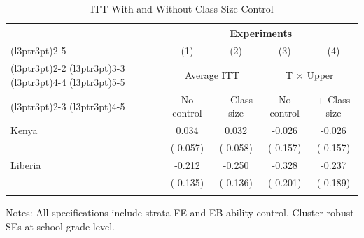 \begin{table}[!h]
\centering
\caption{ITT With and Without Class-Size Control}
\label{tab:classsize_diag}
\begin{threeparttable}
\begin{tabular}[t]{lcccc}
\toprule
\multicolumn{1}{c}{ } & \multicolumn{4}{c}{Experiments} \\
\cmidrule(l{3pt}r{3pt}){2-5}
\multicolumn{1}{c}{ } & \multicolumn{1}{c}{(1)} & \multicolumn{1}{c}{(2)} & \multicolumn{1}{c}{(3)} & \multicolumn{1}{c}{(4)} \\
\cmidrule(l{3pt}r{3pt}){2-2} \cmidrule(l{3pt}r{3pt}){3-3} \cmidrule(l{3pt}r{3pt}){4-4} \cmidrule(l{3pt}r{3pt}){5-5}
 & \multicolumn{2}{c}{Average ITT} & \multicolumn{2}{c}{T $\times$ Upper} \\
\cmidrule(l{3pt}r{3pt}){2-3} \cmidrule(l{3pt}r{3pt}){4-5}
 & No control & + Class size & No control & + Class size \\
\midrule
Kenya &   0.034 &   0.032 &  -0.026 &  -0.026 \\
 & (  0.057) & (  0.058) & (  0.157) & (  0.157) \\
\addlinespace
Liberia &  -0.212 &  -0.250 &  -0.328 &  -0.237 \\
 & (  0.135) & (  0.136) & (  0.201) & (  0.189) \\
\addlinespace
\bottomrule
\end{tabular}
\begin{tablenotes}[para]
\item Notes: All specifications include strata FE and EB ability control. Cluster-robust SEs at school-grade level.
\end{tablenotes}
\end{threeparttable}
\end{table}
